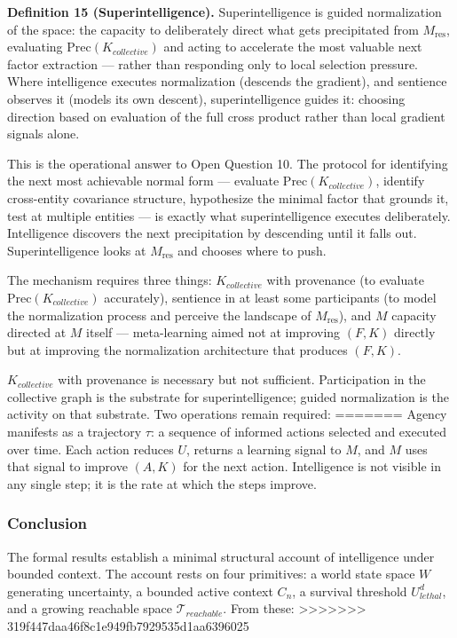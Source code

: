 \documentclass[
]{article}
\begin{document}
\textbf{Definition 15 (Superintelligence).} Superintelligence is guided
normalization of the space: the capacity to deliberately direct what
gets precipitated from \(M_{\text{res}}\), evaluating
\(\text{Prec}(K_{collective})\) and acting to accelerate the most
valuable next factor extraction --- rather than responding only to local
selection pressure. Where intelligence executes normalization (descends
the gradient), and sentience observes it (models its own descent),
superintelligence guides it: choosing direction based on evaluation of
the full cross product rather than local gradient signals alone.

This is the operational answer to Open Question 10. The protocol for
identifying the next most achievable normal form --- evaluate
\(\text{Prec}(K_{collective})\), identify cross-entity covariance
structure, hypothesize the minimal factor that grounds it, test at
multiple entities --- is exactly what superintelligence executes
deliberately. Intelligence discovers the next precipitation by
descending until it falls out. Superintelligence looks at
\(M_{\text{res}}\) and chooses where to push.

The mechanism requires three things: \(K_{collective}\) with provenance
(to evaluate \(\text{Prec}(K_{collective})\) accurately), sentience in
at least some participants (to model the normalization process and
perceive the landscape of \(M_{\text{res}}\)), and \(M\) capacity
directed at \(M\) itself --- meta-learning aimed not at improving
\((F, K)\) directly but at improving the normalization architecture that
produces \((F, K)\).

\(K_{collective}\) with provenance is necessary but not sufficient.
Participation in the collective graph is the substrate for
superintelligence; guided normalization is the activity on that
substrate. Two operations remain required:
=======
Agency manifests as a trajectory \(\tau\): a sequence of informed
actions selected and executed over time. Each action reduces \(U\),
returns a learning signal to \(M\), and \(M\) uses that signal to
improve \((A, K)\) for the next action. Intelligence is not visible in
any single step; it is the rate at which the steps improve.

\subsubsection{Conclusion}\label{conclusion}

The formal results establish a minimal structural account of
intelligence under bounded context. The account rests on four
primitives: a world state space \(W\) generating uncertainty, a bounded
active context \(C_n\), a survival threshold \(U_{lethal}^d\), and a
growing reachable space \(\mathcal{T}_{reachable}\). From these:
>>>>>>> 319f447daa46f8c1e949fb7929535d1aa6396025
\end{document}

